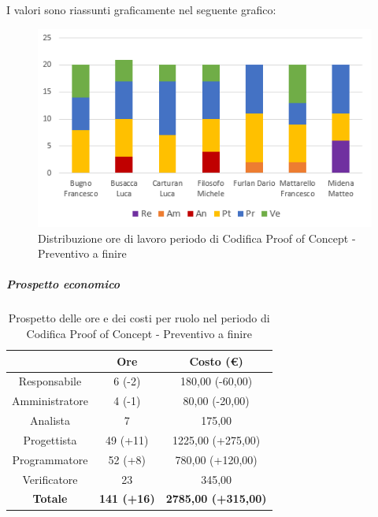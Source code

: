 I valori sono riassunti graficamente nel seguente grafico:
\begin{figure}[H]
  \centering
  \includegraphics[scale=0.9]{immagini/ore_lavoro_preventivo_finire_PoC.png}
  \caption{Distribuzione ore di lavoro periodo di Codifica Proof of Concept\glo{} - Preventivo a finire}
\end{figure}

\subparagraph{Prospetto economico} \label{subparagraph:prospetto_economico_PoC}

\begin{table}[H]
  \centering
  \renewcommand{\arraystretch}{1.8}
  \begin{tabular}{c|c|c}
    \rowcolor[HTML]{125E28}
    \multicolumn{1}{c}{\color[HTML]{FFFFFF}\textbf{Ruolo}}
                    & \multicolumn{1}{c}{\color[HTML]{FFFFFF}\textbf{Ore}}
                    & \multicolumn{1}{c}{\color[HTML]{FFFFFF}\textbf{Costo (€)}}                              \\
    \hline
    Responsabile    & 6 (-2)                                                     & 180,00 (-60,00)            \\
    Amministratore  & 4 (-1)                                                     & 80,00 (-20,00)             \\
    Analista        & 7                                                          & 175,00                     \\
    Progettista     & 49 (+11)                                                   & 1225,00 (+275,00)          \\
    Programmatore   & 52 (+8)                                                    & 780,00 (+120,00)           \\
    Verificatore    & 23                                                         & 345,00                     \\
    \textbf{Totale} & \textbf{141 (+16)}                                         & \textbf{2785,00 (+315,00)} \\
  \end{tabular}
  \caption{Prospetto delle ore e dei costi per ruolo nel periodo di Codifica Proof of Concept\glo{} - Preventivo a finire}
\end{table}

